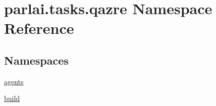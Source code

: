 \hypertarget{namespaceparlai_1_1tasks_1_1qazre}{}\section{parlai.\+tasks.\+qazre Namespace Reference}
\label{namespaceparlai_1_1tasks_1_1qazre}
\subsection*{Namespaces}
\begin{DoxyCompactItemize}
\item 
 \hyperlink{namespaceparlai_1_1tasks_1_1qazre_1_1agents}{agents}
\item 
 \hyperlink{namespaceparlai_1_1tasks_1_1qazre_1_1build}{build}
\end{DoxyCompactItemize}
